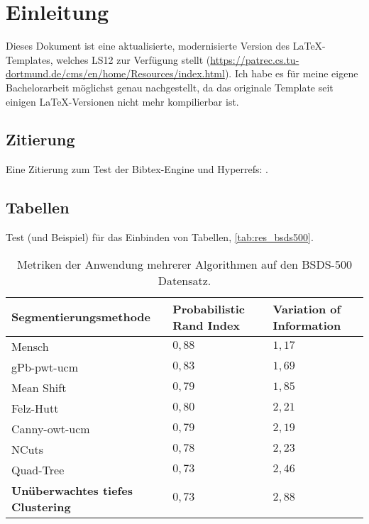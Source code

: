 \chapter{Einleitung}
\label{chap:einleitung}

Dieses Dokument ist eine aktualisierte, modernisierte Version des \LaTeX-Templates, welches LS12 zur Verfügung stellt (\vgl \url{https://patrec.cs.tu-dortmund.de/cms/en/home/Resources/index.html}). Ich habe es für meine eigene Bachelorarbeit möglichst genau nachgestellt, da das originale Template seit einigen \LaTeX-Versionen nicht mehr kompilierbar ist. 

\section{Zitierung}
\label{sec:einleitung/zitierung}
Eine Zitierung zum Test der Bibtex-Engine und Hyperrefs: \cite{test}.

\section{Tabellen}
\label{sec:einleitung/tabellen}
Test (und Beispiel) für das Einbinden von Tabellen, \vgl \autoref{tab:res_bsds500}.

\begin{table}[h!]
	\begin{tabularx}{\textwidth}{p{} >{\centering} p{} >{\centering\arraybackslash} p{}}
		\toprule
		\textbf{Segmentierungsmethode} & \textbf{Probabilistic Rand Index} & \textbf{Variation of Information} \\
		\midrule
		Mensch & $0,88$ & $1,17$ \\
		\midrule
		gPb-pwt-ucm & $0,83$ & $1,69$ \\
		Mean Shift & $0,79$ & $1,85$ \\
		Felz-Hutt & $0,80$ & $2,21$ \\
		Canny-owt-ucm & $0,79$ & $2,19$ \\
		NCuts & $0,78$ & $2,23$ \\
		Quad-Tree & $0,73$ & $2,46$ \\
		\textbf{Unüberwachtes tiefes Clustering} & $0,73$ & $2,88$ \\
		\bottomrule
	\end{tabularx}
	\caption{Metriken der Anwendung mehrerer Algorithmen auf den BSDS-500 Datensatz.}
	\label{tab:res_bsds500}
\end{table}